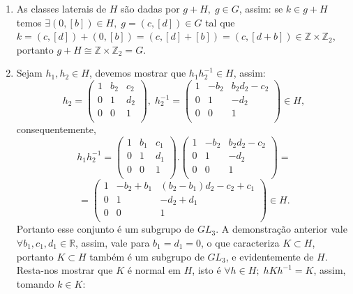 \documentclass{article}
\begin{document}
\begin{enumerate}
		\item As classes laterais de $H$ são dadas por $g+H, \; g\in G$, assim: se $k \in g+H$ temos $\exists (0, [b]) \in H, \; g =(c, [d]) \in G$ tal que $k = (c, [d])+(0,[b]) = (c, [d]+[b]) = (c,[d+b]) \in \mathbb{Z} \times \mathbb{Z}_{2}$, portanto $g+H \cong \mathbb{Z} \times \mathbb{Z}_{2} = G$.
		
		\item Sejam $h_{1}, h_{2} \in H$, devemos mostrar que $h_{1}h_{2}^{-1} \in H$, assim:
		$$
		h_{2} = \left(
		\begin{array}{ccc}
		1 & b_{2} & c_{2} \\
		0 & 1 & d_{2} \\
		0 & 0 & 1 \\
		\end{array}
		\right), \; 
		h_{2}^{-1} = \left(
		\begin{array}{ccc}
		1 & -b_{2} & b_{2}d_{2} - c_{2}\\
		0 & 1 & -d_{2} \\
		0 & 0 & 1 \\
		\end{array}
		\right) \in H,
		$$
		consequentemente,
		$$
		h_{1}h_{2}^{-1} = \left(
		\begin{array}{ccc}
		1 & b_{1} & c_{1} \\
		0 & 1 & d_{1} \\
		0 & 0 & 1 \\
		\end{array}
		\right).
		\left(
		\begin{array}{ccc}
		1 & -b_{2} & b_{2}d_{2} - c_{2}\\
		0 & 1 & -d_{2} \\
		0 & 0 & 1 \\
		\end{array}
		\right) = 
		$$
		$$
		= 		\left(
		\begin{array}{ccc}
		1 & -b_{2}+b_{1} & (b_{2}- b_{1})d_{2} - c_{2} +c_{1}\\
		0 & 1 & -d_{2} + d_{1}\\
		0 & 0 & 1 \\
		\end{array}
		\right) \in H.
		$$
		Portanto esse conjunto é um subgrupo de $GL_{3}$.
		A demonstração anterior vale $\forall b_{1}, c_{1}, d_{1} \in \mathbb{R}$, assim, vale para $b_{1}=d_{1}=0$, o que caracteriza $K \subset H$, portanto $K \subset H$ também é um subgrupo de $GL_{3}$, e evidentemente de $H$. Resta-nos mostrar que $K$ é normal em $H$, isto é $\forall h \in H; \; hKh^{-1} = K$, assim, tomando $k \in K$:

\end{enumerate}
\end{document}
